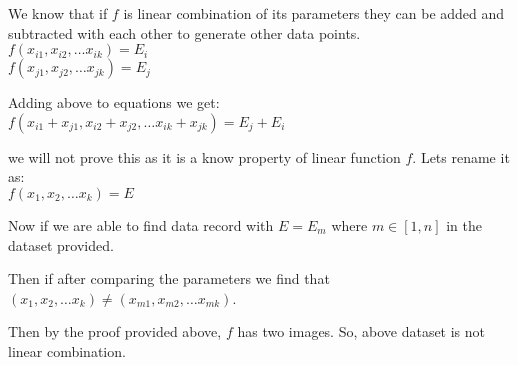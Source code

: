 We know that if \(f\) is linear combination of its parameters they can be added and subtracted with each other to generate other data points.\\
\(f(x_{i1}, x_{i2}, \ldots x_{ik}) = E_i\)\\
\(f(x_{j1}, x_{j2}, \ldots x_{jk}) = E_j\)

Adding above to equations we get:\\
\(f(x_{i1} + x_{j1},x_{i2} + x_{j2}, \ldots x_{ik} + x_{jk}) = E_j + E_i\)

we will not prove this as it is a know property of linear function \(f\).
Lets rename it as:\\
\(f(x_{1}, x_{2}, \ldots x_{k}) = E\)

Now if we are able to find data record with \(E = E_m\) where \(m \in [1, n]\) in the dataset provided.

Then if after comparing the parameters we find that \((x_{1}, x_{2}, \ldots x_{k})\neq(x_{m1}, x_{m2}, \ldots x_{mk})\).

Then by the proof provided above, \(f\) has two images. So, above dataset is not linear combination.
